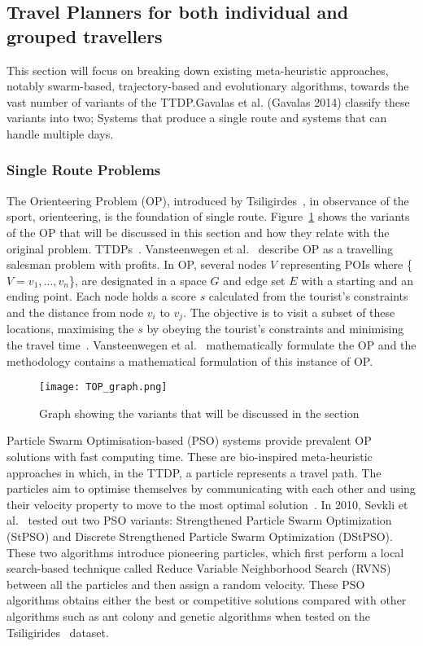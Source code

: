 \subsection{Travel Planners for both individual and grouped travellers}

This section will focus on breaking down existing meta-heuristic approaches,
notably swarm-based, trajectory-based and evolutionary algorithms, towards the
vast number of variants of the TTDP.\@ Gavalas et al. (Gavalas 2014) classify
these variants into two; Systems that produce a single route and systems that
can handle multiple days. 


\subsubsection{Single Route Problems}

The Orienteering Problem (OP), introduced by Tsiligirdes~\cite{Tsiligirides1984},
in observance of the sport, orienteering, is the foundation of single route. 
Figure~\ref{variants} shows the variants of the OP that will be discussed in
this section and how they relate with the original problem.
TTDPs~\cite{Herzog2020}. Vansteenwegen et al.~\cite{Vansteenwegen2011b} describe
OP as a travelling salesman problem with profits. In OP, several nodes $V$
representing POIs where \{$V= {v_1,\ldots,v_n}$\}, are designated in a space
$G$ and edge set $E$ with a starting and an ending
point. Each node holds a score $s$ calculated from the tourist's constraints
and the distance from node $v_i$ to $v_j$. The
objective is to visit a subset of these locations, maximising the $s$ by
obeying the tourist's constraints and minimising the travel
time~\cite{Sylejmani2017}. Vansteenwegen et al.~\cite{Vansteenwegen2011}
mathematically formulate the OP and the methodology contains a mathematical formulation
of this instance of OP.\@

\begin{figure}[h]
\centering
\texttt{[image: TOP\_graph.png]}
\caption{Graph showing the variants that will be discussed in the section}
\label{variants}
\end{figure}

Particle Swarm Optimisation-based (PSO) systems provide prevalent OP solutions
with fast computing time. These are bio-inspired meta-heuristic approaches in
which, in the TTDP, a particle represents a travel path. The particles aim to
optimise themselves by communicating with each other and using their velocity
property to move to the most optimal solution~\cite{RezaeeJordehi2013}. In 2010, Sevkli
et al.~\cite{Sevkli2010,Sevkli2010a} tested out two PSO variants:
Strengthened Particle Swarm Optimization (StPSO) and Discrete Strengthened
Particle Swarm Optimization (DStPSO). These two algorithms introduce pioneering
particles, which first perform a local search-based technique called Reduce
Variable Neighborhood Search (RVNS) between all the particles and then assign a
random velocity. These PSO algorithms obtains either the best or competitive
solutions compared with other algorithms such as ant colony and genetic
algorithms when tested on the Tsiligirides~\cite{Tsiligirides1984, Chen2011a} dataset.


